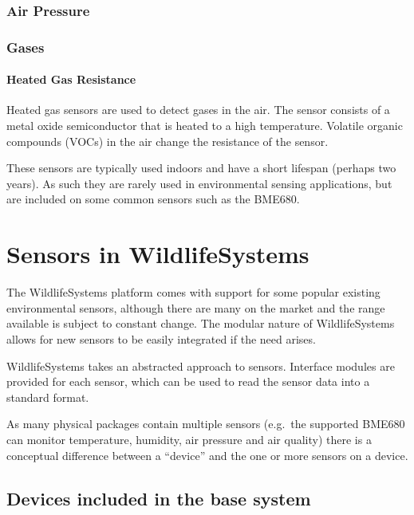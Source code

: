 \documentclass[
]{book}
\begin{document}
\subsection{Air Pressure}\label{air-pressure}

\subsection{Gases}\label{gases}

\subsubsection{Heated Gas Resistance}\label{heated-gas-resistance}

Heated gas sensors are used to detect gases in the air. The sensor consists of a metal oxide semiconductor that is heated to a high temperature. Volatile organic compounds (VOCs) in the air change the resistance of the sensor.

These sensors are typically used indoors and have a short lifespan (perhaps two years). As such they are rarely used in environmental sensing applications, but are included on some common sensors such as the BME680.

\chapter{Sensors in WildlifeSystems}\label{sensors-in-wildlifesystems}

The WildlifeSystems platform comes with support for some popular existing environmental sensors, although there are many on the market and the range available is subject to constant change. The modular nature of WildlifeSystems allows for new sensors to be easily integrated if the need arises.

WildlifeSystems takes an abstracted approach to sensors. Interface modules are provided for each sensor, which can be used to read the sensor data into a standard format.

As many physical packages contain multiple sensors (e.g.~the supported BME680 can monitor temperature, humidity, air pressure and air quality) there is a conceptual difference between a ``device'' and the one or more sensors on a device.

\section{Devices included in the base system}\label{devices-included-in-the-base-system}
\end{document}
